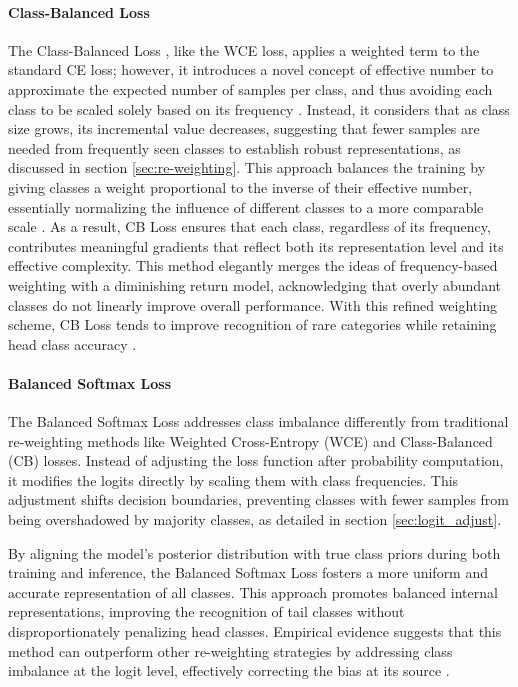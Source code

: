 \paragraph{Class-Balanced Loss}
The Class-Balanced Loss \cite{cui2019classbalancedlossbasedeffective}, like the WCE loss, applies a weighted term to the standard CE loss; however, it introduces a novel concept of effective number to approximate the expected number of samples per class, and thus avoiding each class to be scaled solely based on its frequency \cite{zhang2023deep,cui2019classbalancedlossbasedeffective}. Instead, it considers that as class size grows, its incremental value decreases, suggesting that fewer samples are needed from frequently seen classes to establish robust representations, as discussed in section \ref{sec:re-weighting}. This approach balances the training by giving classes a weight proportional to the inverse of their effective number, essentially normalizing the influence of different classes to a more comparable scale \cite{zhang2023deep}. As a result, CB Loss ensures that each class, regardless of its frequency, contributes meaningful gradients that reflect both its representation level and its effective complexity. This method elegantly merges the ideas of frequency-based weighting with a diminishing return model, acknowledging that overly abundant classes do not linearly improve overall performance. With this refined weighting scheme, CB Loss tends to improve recognition of rare categories while retaining head class accuracy \cite{cui2019classbalancedlossbasedeffective}. 

\paragraph{Balanced Softmax Loss}
The Balanced Softmax Loss \cite{ren2020balancedmetasoftmaxlongtailedvisual} addresses class imbalance differently from traditional re-weighting methods like Weighted Cross-Entropy (WCE) and Class-Balanced (CB) losses. Instead of adjusting the loss function after probability computation, it modifies the logits directly by scaling them with class frequencies. This adjustment shifts decision boundaries, preventing classes with fewer samples from being overshadowed by majority classes, as detailed in section \ref{sec:logit_adjust}.

By aligning the model's posterior distribution with true class priors during both training and inference, the Balanced Softmax Loss fosters a more uniform and accurate representation of all classes. This approach promotes balanced internal representations, improving the recognition of tail classes without disproportionately penalizing head classes. Empirical evidence suggests that this method can outperform other re-weighting strategies by addressing class imbalance at the logit level, effectively correcting the bias at its source \cite{ren2020balancedmetasoftmaxlongtailedvisual}.

